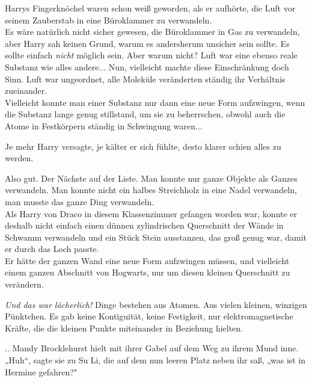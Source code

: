 {Harrys Fingerknöchel waren schon weiß geworden, als er aufhörte, die Luft vor seinem Zauberstab in eine Büroklammer zu verwandeln.\\ Es wäre natürlich nicht sicher gewesen, die Büroklammer in Gas zu verwandeln, aber Harry sah keinen Grund, warum es andersherum unsicher sein sollte. Es sollte einfach \emph{nicht} möglich sein. Aber warum nicht? Luft war eine ebenso reale Substanz wie alles andere... Nun, vielleicht machte diese Einschränkung doch Sinn. Luft war ungeordnet, alle Moleküle veränderten ständig ihr Verhältnis zueinander.\\ Vielleicht konnte man einer Substanz nur dann eine neue Form aufzwingen, wenn die Substanz lange genug stillstand, um sie zu beherrschen, obwohl auch die Atome in Festkörpern ständig in Schwingung waren...

Je mehr Harry versagte, je kälter er sich fühlte, desto klarer schien alles zu werden.

Also gut. Der Nächste auf der Liste. Man konnte nur ganze Objekte als Ganzes verwandeln. Man konnte nicht ein halbes Streichholz in eine Nadel verwandeln, man musste das ganze Ding verwandeln.\\ Als Harry von Draco in diesem Klassenzimmer gefangen worden war, konnte er deshalb nicht einfach einen dünnen zylindrischen Querschnitt der Wände in Schwamm verwandeln und ein Stück Stein ausstanzen, das groß genug war, damit er durch das Loch passte.\\ Er hätte der ganzen Wand eine neue Form aufzwingen müssen, und vielleicht einem ganzen Abschnitt von Hogwarts, nur um diesen kleinen Querschnitt zu verändern.

\emph{Und das war lächerlich!} Dinge bestehen aus Atomen. Aus vielen kleinen, winzigen Pünktchen. Es gab keine Kontiguität, keine Festigkeit, nur elektromagnetische Kräfte, die die kleinen Punkte miteinander in Beziehung hielten.

.. Mandy Brocklehurst hielt mit ihrer Gabel auf dem Weg zu ihrem Mund inne. „Huh“, sagte sie zu Su Li, die auf dem nun leeren Platz neben ihr saß, „was ist in Hermine gefahren?"

}
